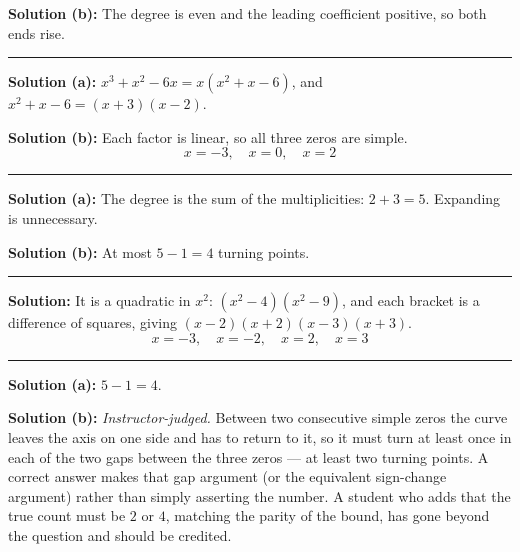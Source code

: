 \documentclass[12pt]{article}
\begin{document}
\textbf{Solution (b):} The degree is even and the leading coefficient positive, so both ends rise. 

\vspace{0.1cm}\noindent\rule{\linewidth}{0.2pt}


\textbf{Solution (a):} $x^{3} + x^{2} - 6x = x\left(x^{2} + x - 6\right)$, and $x^{2} + x - 6 = (x+3)(x-2)$. 

\textbf{Solution (b):} Each factor is linear, so all three zeros are simple.
\[ \boxed{x = -3, \quad x = 0, \quad x = 2} \]

\vspace{0.1cm}\noindent\rule{\linewidth}{0.2pt}


\textbf{Solution (a):} The degree is the sum of the multiplicities: $2 + 3 = 5$. Expanding is unnecessary. 

\textbf{Solution (b):} At most $5 - 1 = 4$ turning points. 

\vspace{0.1cm}\noindent\rule{\linewidth}{0.2pt}


\textbf{Solution:} It is a quadratic in $x^{2}$: $\left(x^{2} - 4\right)\left(x^{2} - 9\right)$, and each bracket is a difference of squares, giving $(x-2)(x+2)(x-3)(x+3)$.
\[ \boxed{x = -3, \quad x = -2, \quad x = 2, \quad x = 3} \]

\vspace{0.1cm}\noindent\rule{\linewidth}{0.2pt}


\textbf{Solution (a):} $5 - 1 = 4$. 

\textbf{Solution (b):} \emph{Instructor-judged.} Between two consecutive simple zeros the curve leaves the axis on one side and has to return to it, so it must turn at least once in each of the two gaps between the three zeros --- at least two turning points. A correct answer makes that gap argument (or the equivalent sign-change argument) rather than simply asserting the number. A student who adds that the true count must be $2$ or $4$, matching the parity of the bound, has gone beyond the question and should be credited.
\end{document}
